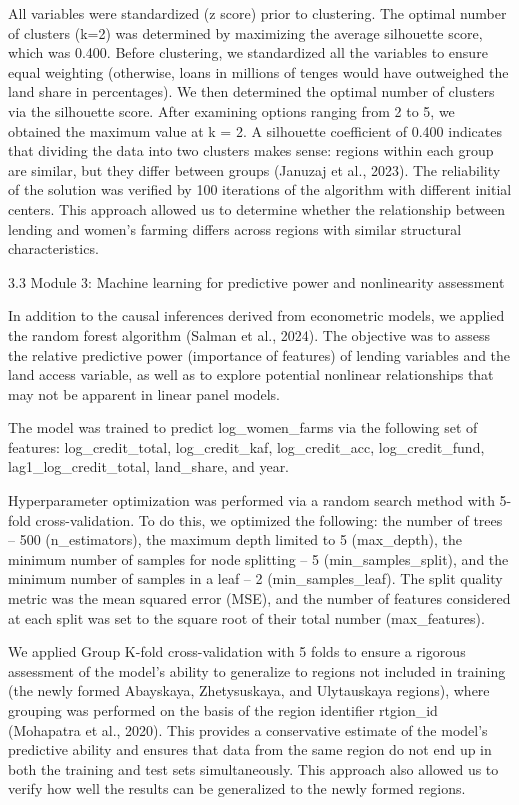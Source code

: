 \documentclass[
]{article}
\begin{document}
All variables were standardized (z score) prior to clustering. The
optimal number of clusters (k=2) was determined by maximizing the
average silhouette score, which was 0.400. Before clustering, we
standardized all the variables to ensure equal weighting (otherwise,
loans in millions of tenges would have outweighed the land share in
percentages). We then determined the optimal number of clusters via the
silhouette score. After examining options ranging from 2 to 5, we
obtained the maximum value at k = 2. A silhouette coefficient of 0.400
indicates that dividing the data into two clusters makes sense: regions
within each group are similar, but they differ between groups (Januzaj
et al., 2023). The reliability of the solution was verified by 100
iterations of the algorithm with different initial centers. This
approach allowed us to determine whether the relationship between
lending and women's farming differs across regions with similar
structural characteristics.

3.3 Module 3: Machine learning for predictive power and nonlinearity
assessment

In addition to the causal inferences derived from econometric models, we
applied the random forest algorithm (Salman et al., 2024). The objective
was to assess the relative predictive power (importance of features) of
lending variables and the land access variable, as well as to explore
potential nonlinear relationships that may not be apparent in linear
panel models.

The model was trained to predict log\_women\_farms via the following set
of features: log\_credit\_total, log\_credit\_kaf, log\_credit\_acc,
log\_credit\_fund, lag1\_log\_credit\_total, land\_share, and year.

Hyperparameter optimization was performed via a random search method
with 5-fold cross-validation. To do this, we optimized the following:
the number of trees -- 500 (n\_estimators), the maximum depth limited to
5 (max\_depth), the minimum number of samples for node splitting -- 5
(min\_samples\_split), and the minimum number of samples in a leaf -- 2
(min\_samples\_leaf). The split quality metric was the mean squared
error (MSE), and the number of features considered at each split was set
to the square root of their total number (max\_features).

We applied Group K-fold cross-validation with 5 folds to ensure a
rigorous assessment of the model's ability to generalize to regions not
included in training (the newly formed Abayskaya, Zhetysuskaya, and
Ulytauskaya regions), where grouping was performed on the basis of the
region identifier rtgion\_id (Mohapatra et al., 2020). This provides a
conservative estimate of the model's predictive ability and ensures that
data from the same region do not end up in both the training and test
sets simultaneously. This approach also allowed us to verify how well
the results can be generalized to the newly formed regions.
\end{document}
